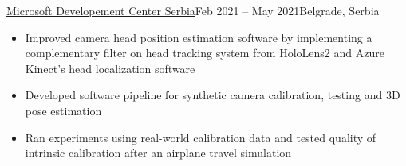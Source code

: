 \documentclass[10pt,a4paper]{source/altacv}
\begin{document}
\divider

 {\href{https://www.microsoft.com/en-rs/mdcs}{Microsoft Developement Center Serbia}}{Feb 2021 -- May 2021}{Belgrade, Serbia}

\begin{itemize}
    \item   \small{Improved camera head position estimation software by implementing a complementary filter on head tracking system from HoloLens2 and Azure Kinect's head localization software}
    \item   \small{Developed software pipeline for synthetic camera calibration, testing and 3D pose estimation}
    \item \small{Ran experiments using real-world calibration data and tested quality of intrinsic calibration after an airplane travel simulation}
    \\
    \smallskip
    \smallskip
     
\end{itemize}








\end{document}

